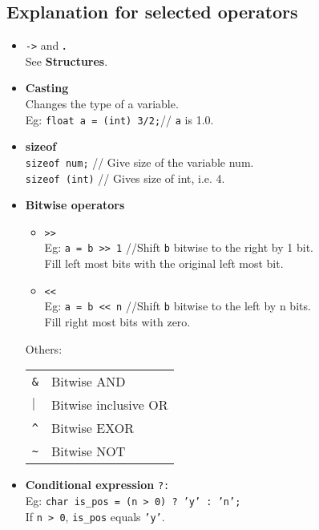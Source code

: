 \begin{multicols*}{3}
\subsection{Explanation for selected operators}

\begin{itemize}

\item \texttt{->} and \textbf{.}\\
See \textbf{Structures}.
\item \textbf{Casting}\\
Changes the type of a variable.\\
Eg:  \texttt{float a = (int) 3/2;}// \texttt{a} is 1.0.\\
\item \textbf{sizeof}\\
\texttt{sizeof num;} // Give size of the variable num.\\
\texttt{sizeof (int)} // Gives size of int, i.e. 4.\\
\item \textbf{Bitwise operators}
\begin{itemize}
\item \texttt{>>}\\
Eg: \texttt{a = b >> 1} //Shift \texttt{b} bitwise to the right by 1 bit.\\
Fill left most bits with the original left most bit.
\item \texttt{<<}\\
Eg: \texttt{a = b << n} //Shift \texttt{b} bitwise to the left by n bits.\\
Fill right most bits with zero.
\end{itemize}
Others:\\
\begin{tabularx}{\linewidth}{l|X}
\hline
\texttt{\&} & Bitwise AND\\
\texttt{$\mid$} & Bitwise inclusive OR\\
\texttt{\^} & Bitwise EXOR\\
\texttt{\~} & Bitwise NOT\\
\hline
\end{tabularx}



\item \textbf{Conditional expression}
\texttt{?:}\\
Eg: \texttt{char is\_pos = (n > 0) ? 'y' : 'n';}\\
If \texttt{n > 0}, \texttt{is\_pos} equals \texttt{'y'}.


\end{itemize}
\end{multicols*}

